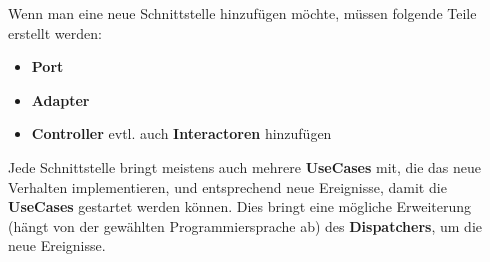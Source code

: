 Wenn man eine neue Schnittstelle hinzufügen möchte, müssen folgende Teile erstellt werden:
\begin{itemize}
    \item \textbf{Port}
    \item \textbf{Adapter}
    \item \textbf{Controller} evtl. auch \textbf{Interactoren} hinzufügen
\end{itemize}

Jede Schnittstelle bringt meistens auch mehrere \textbf{UseCases} mit, die das neue Verhalten implementieren, und entsprechend neue 
Ereignisse, damit die \textbf{UseCases} gestartet werden können. 
Dies bringt eine mögliche Erweiterung (hängt von der gewählten Programmiersprache ab) des \textbf{Dispatchers}, um die neue Ereignisse.